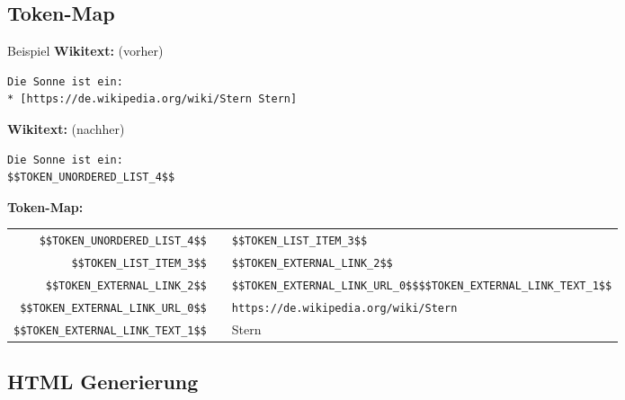 \documentclass[9pt]{beamer}
\begin{document}
	\subsection{Token-Map}

	\begin{frame}[fragile]{Beispiel}
		\textbf{Wikitext:} (vorher)\\
		\begin{verbatim}
Die Sonne ist ein:
* [https://de.wikipedia.org/wiki/Stern Stern]
		\end{verbatim}\n\pause
		\textbf{Wikitext:} (nachher)\\
		\begin{verbatim}
Die Sonne ist ein:
$$TOKEN_UNORDERED_LIST_4$$
		\end{verbatim}\n\pause
		\textbf{Token-Map:}\n
		\hspace{-0.65cm}
		\addtolength{\tabcolsep}{-0.5\tabcolsep}
		\begin{tabularx}{\textwidth}{rcp{6cm}}
			\verb+$$TOKEN_UNORDERED_LIST_4$$+		& \textrightarrow & \verb+$$TOKEN_LIST_ITEM_3$$+\\
			\verb+$$TOKEN_LIST_ITEM_3$$+			& \textrightarrow & \verb+$$TOKEN_EXTERNAL_LINK_2$$+\\
			\verb+$$TOKEN_EXTERNAL_LINK_2$$+		& \textrightarrow & \verb+$$TOKEN_EXTERNAL_LINK_URL_0$$+\newline\verb+$$TOKEN_EXTERNAL_LINK_TEXT_1$$+\\
			\verb+$$TOKEN_EXTERNAL_LINK_URL_0$$+	& \textrightarrow & \verb+https://de.wikipedia.org/wiki/Stern+\\
			\verb+$$TOKEN_EXTERNAL_LINK_TEXT_1$$+	& \textrightarrow & Stern\\
		\end{tabularx}
	\end{frame}

	\subsection{HTML Generierung}
\end{document}
